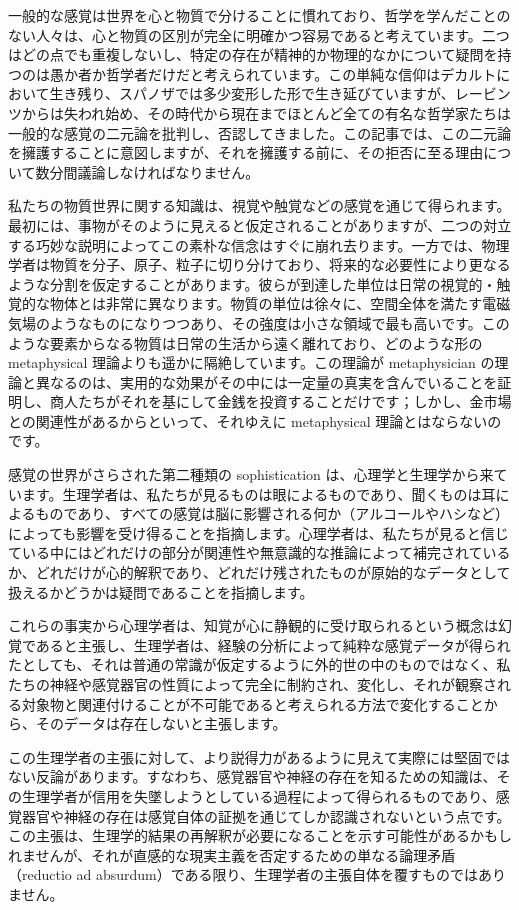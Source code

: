\documentclass[a4paper,11pt,openany]{ltjsbook}
\begin{document}
一般的な感覚は世界を心と物質で分けることに慣れており、哲学を学んだことのない人々は、心と物質の区別が完全に明確かつ容易であると考えています。二つはどの点でも重複しないし、特定の存在が精神的か物理的なかについて疑問を持つのは愚か者か哲学者だけだと考えられています。この単純な信仰はデカルトにおいて生き残り、スパノザでは多少変形した形で生き延びていますが、レービンツからは失われ始め、その時代から現在までほとんど全ての有名な哲学家たちは一般的な感覚の二元論を批判し、否認してきました。この記事では、この二元論を擁護することに意図しますが、それを擁護する前に、その拒否に至る理由について数分間議論しなければなりません。

私たちの物質世界に関する知識は、視覚や触覚などの感覚を通じて得られます。最初には、事物がそのように見えると仮定されることがありますが、二つの対立する巧妙な説明によってこの素朴な信念はすぐに崩れ去ります。一方では、物理学者は物質を分子、原子、粒子に切り分けており、将来的な必要性により更なるような分割を仮定することがあります。彼らが到達した単位は日常の視覚的・触覚的な物体とは非常に異なります。物質の単位は徐々に、空間全体を満たす電磁気場のようなものになりつつあり、その強度は小さな領域で最も高いです。このような要素からなる物質は日常の生活から遠く離れており、どのような形の metaphysical 理論よりも遥かに隔絶しています。この理論が metaphysician の理論と異なるのは、実用的な効果がその中には一定量の真実を含んでいることを証明し、商人たちがそれを基にして金銭を投資することだけです；しかし、金市場との関連性があるからといって、それゆえに metaphysical 理論とはならないのです。


感覚の世界がさらされた第二種類の sophistication は、心理学と生理学から来ています。生理学者は、私たちが見るものは眼によるものであり、聞くものは耳によるものであり、すべての感覚は脳に影響される何か（アルコールやハシなど）によっても影響を受け得ることを指摘します。心理学者は、私たちが見ると信じている中にはどれだけの部分が関連性や無意識的な推論によって補完されているか、どれだけが心的解釈であり、どれだけ残されたものが原始的なデータとして扱えるかどうかは疑問であることを指摘します。

これらの事実から心理学者は、知覚が心に静観的に受け取られるという概念は幻覚であると主張し、生理学者は、経験の分析によって純粋な感覚データが得られたとしても、それは普通の常識が仮定するように外的世の中のものではなく、私たちの神経や感覚器官の性質によって完全に制約され、変化し、それが観察される対象物と関連付けることが不可能であると考えられる方法で変化することから、そのデータは存在しないと主張します。

この生理学者の主張に対して、より説得力があるように見えて実際には堅固ではない反論があります。すなわち、感覚器官や神経の存在を知るための知識は、その生理学者が信用を失墜しようとしている過程によって得られるものであり、感覚器官や神経の存在は感覚自体の証拠を通じてしか認識されないという点です。この主張は、生理学的結果の再解釈が必要になることを示す可能性があるかもしれませんが、それが直感的な現実主義を否定するための単なる論理矛盾（reductio ad absurdum）である限り、生理学者の主張自体を覆すものではありません。
\end{document}
